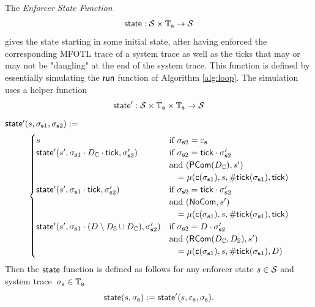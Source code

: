\begin{definition}
    \label{def:enforcer-state-function}
    The \emph{Enforcer State Function}
    \begin{equation*}
        \mathsf{state} : \mathcal{S} \times \mathbb{T}_{\mathbf{s}} \to \mathcal{S}
    \end{equation*}
    gives the state starting in some initial state, after having enforced
    the corresponding MFOTL trace of a system trace as well as the ticks
    that may or may not be "dangling" at the end of the system trace.
    This function is defined by essentially simulating the $\mathsf{run}$ function of
    Algorithm \ref{alg:loop}.
    The simulation uses a helper function
    \begin{equation*}
        \mathsf{state}' : \mathcal{S} \times \mathbb{T}_{\mathbf{s}} \times \mathbb{T}_{\mathbf{s}} \to \mathcal{S}
    \end{equation*}
    $\mathsf{state}'(s, \sigma_{\mathbf{s} 1}, \sigma_{\mathbf{s} 2}) := $
    \begin{align*}
        \begin{cases}
            s
                &\text{if } \sigma_{\mathbf{s} 2} = \varepsilon_{\mathbf{s}} \\
            \mathsf{state}'(s', \sigma_{\mathbf{s} 1} \cdot D_{\mathbb{C}} \cdot \mathsf{tick}, \sigma_{\mathbf{s} 2}')
                &\text{if } \sigma_{\mathbf{s} 2} = \mathsf{tick} \cdot \sigma_{\mathbf{s} 2}' \\
                &\text{and } (\mathsf{PCom}(D_{\mathbb{C}}), s') \\
                &\quad = \mu(\mathsf{c}(\sigma_{\mathbf{s} 1}), s, \mathsf{\#tick}(\sigma_{\mathbf{s} 1}), \mathsf{tick}) \\
            \mathsf{state}'(s', \sigma_{\mathbf{s} 1} \cdot \mathsf{tick}, \sigma_{\mathbf{s} 2}')
                &\text{if } \sigma_{\mathbf{s} 2} = \mathsf{tick} \cdot \sigma_{\mathbf{s} 2}' \\
                &\text{and } (\mathsf{NoCom}, s') \\
                &\quad = \mu(\mathsf{c}(\sigma_{\mathbf{s} 1}), s, \mathsf{\#tick}(\sigma_{\mathbf{s} 1}), \mathsf{tick}) \\
            \mathsf{state}'(s', \sigma_{\mathbf{s} 1} \cdot (D \setminus D_{\mathbb{S}} \cup D_{\mathbb{C}}), \sigma_{\mathbf{s} 2}')
                &\text{if } \sigma_{\mathbf{s} 2} = D \cdot \sigma_{\mathbf{s} 2}' \\
                &\text{and } (\mathsf{RCom}(D_{\mathbb{C}}, D_{\mathbb{S}}), s') \\
                &\quad = \mu(\mathsf{c}(\sigma_{\mathbf{s} 1}), s, \mathsf{\#tick}(\sigma_{\mathbf{s} 1}), D)
        \end{cases}
    \end{align*}
    Then the $\mathsf{state}$ function is defined as follows for any enforcer state
    $s \in \mathcal{S}$ and system trace~$\sigma_{\mathbf{s}} \in \mathbb{T}_{\mathbf{s}}$
    \begin{equation*}
        \mathsf{state}(s, \sigma_{\mathbf{s}}) := \mathsf{state}'(s, \varepsilon_{\mathbf{s}}, \sigma_{\mathbf{s}}).
    \end{equation*}
\end{definition}

